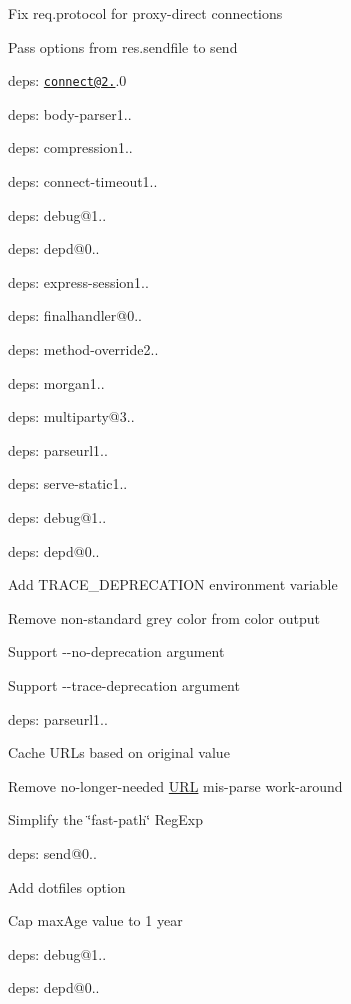 \begin{DoxyItemize}
\item Fix {\ttfamily req.\+protocol} for proxy-\/direct connections
\item Pass options from {\ttfamily res.\+sendfile} to {\ttfamily send}
\item deps\+: \href{mailto:connect@2.24}{\tt connect@2.}.0
\begin{DoxyItemize}
\item deps\+: body-\/parser1..
\item deps\+: compression1..
\item deps\+: connect-\/timeout1..
\item deps\+: debug@1..
\item deps\+: depd@0..
\item deps\+: express-\/session1..
\item deps\+: finalhandler@0..
\item deps\+: method-\/override2..
\item deps\+: morgan1..
\item deps\+: multiparty@3..
\item deps\+: parseurl1..
\item deps\+: serve-\/static1..
\end{DoxyItemize}
\item deps\+: debug@1..
\item deps\+: depd@0..
\begin{DoxyItemize}
\item Add {\ttfamily T\+R\+A\+C\+E\+\_\+\+D\+E\+P\+R\+E\+C\+A\+T\+I\+O\+N} environment variable
\item Remove non-\/standard grey color from color output
\item Support {\ttfamily -\/-\/no-\/deprecation} argument
\item Support {\ttfamily -\/-\/trace-\/deprecation} argument
\end{DoxyItemize}
\item deps\+: parseurl1..
\begin{DoxyItemize}
\item Cache U\+R\+Ls based on original value
\item Remove no-\/longer-\/needed \hyperlink{struct_u_r_l}{U\+R\+L} mis-\/parse work-\/around
\item Simplify the \char`\"{}fast-\/path\char`\"{} {\ttfamily Reg\+Exp}
\end{DoxyItemize}
\item deps\+: send@0..
\begin{DoxyItemize}
\item Add {\ttfamily dotfiles} option
\item Cap {\ttfamily max\+Age} value to 1 year
\item deps\+: debug@1..
\item deps\+: depd@0..
\end{DoxyItemize}
\end{DoxyItemize}

